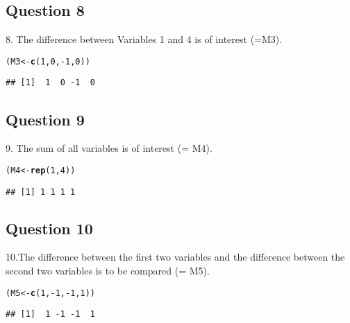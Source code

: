 \documentclass{article}\usepackage[]{graphicx}\usepackage[]{color}
\makeatletter
\newcommand{\hlnum}[1]{\textcolor[rgb]{0.686,0.059,0.569}{#1}}%
\newcommand{\hlopt}[1]{\textcolor[rgb]{0,0,0}{#1}}%
\newcommand{\hlstd}[1]{\textcolor[rgb]{0.345,0.345,0.345}{#1}}%
\newcommand{\hlkwb}[1]{\textcolor[rgb]{0.69,0.353,0.396}{#1}}%
\newcommand{\hlkwd}[1]{\textcolor[rgb]{0.737,0.353,0.396}{\textbf{#1}}}%
\newenvironment{kframe}{%
 \def\at@end@of@kframe{}%
 \ifinner\ifhmode%
  \def\at@end@of@kframe{\end{minipage}}%
  \begin{minipage}{\columnwidth}%
 \fi\fi%
 \def\FrameCommand##1{\hskip\@totalleftmargin \hskip-\fboxsep
 \colorbox{shadecolor}{##1}\hskip-\fboxsep
     \hskip-\linewidth \hskip-\@totalleftmargin \hskip\columnwidth}%
 \MakeFramed {\advance\hsize-\width
   \@totalleftmargin\z@ \linewidth\hsize
   \@setminipage}}%
 {\par\unskip\endMakeFramed%
 \at@end@of@kframe}
\newenvironment{knitrout}{}{} %
\makeatother
\begin{document}
\subsection{Question 8}
8. The difference between Variables 1 and 4 is of interest (=M3).  
\begin{knitrout}
\color{fgcolor}\begin{kframe}
\begin{alltt}
\hlstd{(M3} \hlkwb{<-} \hlkwd{c}\hlstd{(}\hlnum{1}\hlstd{,} \hlnum{0}\hlstd{,} \hlopt{-}\hlnum{1}\hlstd{,} \hlnum{0}\hlstd{))}
\end{alltt}
\begin{verbatim}
## [1]  1  0 -1  0
\end{verbatim}
\end{kframe}
\end{knitrout}

\subsection{Question 9}
9. The sum of all variables is of interest (= M4).
\begin{knitrout}
\color{fgcolor}\begin{kframe}
\begin{alltt}
\hlstd{(M4} \hlkwb{<-} \hlkwd{rep}\hlstd{(}\hlnum{1}\hlstd{,}\hlnum{4}\hlstd{))}
\end{alltt}
\begin{verbatim}
## [1] 1 1 1 1
\end{verbatim}
\end{kframe}
\end{knitrout}


\subsection{Question 10}
10.The difference between the first two variables and the difference between the second two variables is to be compared (= M5).
\begin{knitrout}
\color{fgcolor}\begin{kframe}
\begin{alltt}
\hlstd{(M5} \hlkwb{<-} \hlkwd{c}\hlstd{(}\hlnum{1}\hlstd{,} \hlopt{-}\hlnum{1}\hlstd{,} \hlopt{-}\hlnum{1}\hlstd{,} \hlnum{1}\hlstd{))}
\end{alltt}
\begin{verbatim}
## [1]  1 -1 -1  1
\end{verbatim}
\end{kframe}
\end{knitrout}
\end{document}
